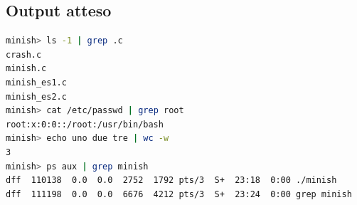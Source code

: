 \documentclass[a4paper,12pt]{article}
\begin{document}
\newpage
\subsection{Output atteso}

\begin{lstlisting}[language=bash, caption={Test Esercizio 3 -- pipe}]
minish> ls -1 | grep .c
crash.c
minish.c
minish_es1.c
minish_es2.c
minish> cat /etc/passwd | grep root
root:x:0:0::/root:/usr/bin/bash
minish> echo uno due tre | wc -w
3
minish> ps aux | grep minish
dff  110138  0.0  0.0  2752  1792 pts/3  S+  23:18  0:00 ./minish
dff  111198  0.0  0.0  6676  4212 pts/3  S+  23:24  0:00 grep minish
\end{lstlisting}
\end{document}

